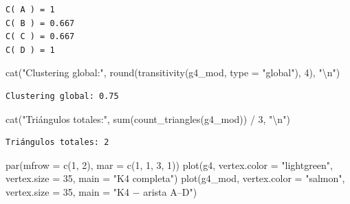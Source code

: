 \documentclass[
  letterpaper,
  DIV=11,
  numbers=noendperiod]{scrreprt}
\newenvironment{Shaded}{\begin{snugshade}}{\end{snugshade}}
\newcommand{\AttributeTok}[1]{\textcolor[rgb]{0.40,0.45,0.13}{#1}}
\newcommand{\DecValTok}[1]{\textcolor[rgb]{0.68,0.00,0.00}{#1}}
\newcommand{\FunctionTok}[1]{\textcolor[rgb]{0.28,0.35,0.67}{#1}}
\newcommand{\NormalTok}[1]{\textcolor[rgb]{0.00,0.23,0.31}{#1}}
\newcommand{\SpecialCharTok}[1]{\textcolor[rgb]{0.37,0.37,0.37}{#1}}
\newcommand{\StringTok}[1]{\textcolor[rgb]{0.13,0.47,0.30}{#1}}
\begin{document}
\begin{tcolorbox}
\begin{verbatim}
C( A ) = 1 
C( B ) = 0.667 
C( C ) = 0.667 
C( D ) = 1 
\end{verbatim}

\begin{Shaded}
\begin{Highlighting}[]
\FunctionTok{cat}\NormalTok{(}\StringTok{"Clustering global:"}\NormalTok{, }\FunctionTok{round}\NormalTok{(}\FunctionTok{transitivity}\NormalTok{(g4\_mod, }\AttributeTok{type =} \StringTok{"global"}\NormalTok{), }\DecValTok{4}\NormalTok{), }\StringTok{"}\SpecialCharTok{\textbackslash{}n}\StringTok{"}\NormalTok{)}
\end{Highlighting}
\end{Shaded}

\begin{verbatim}
Clustering global: 0.75 
\end{verbatim}

\begin{Shaded}
\begin{Highlighting}[]
\FunctionTok{cat}\NormalTok{(}\StringTok{"Triángulos totales:"}\NormalTok{, }\FunctionTok{sum}\NormalTok{(}\FunctionTok{count\_triangles}\NormalTok{(g4\_mod)) }\SpecialCharTok{/} \DecValTok{3}\NormalTok{, }\StringTok{"}\SpecialCharTok{\textbackslash{}n}\StringTok{"}\NormalTok{)}
\end{Highlighting}
\end{Shaded}

\begin{verbatim}
Triángulos totales: 2 
\end{verbatim}

\begin{Shaded}
\begin{Highlighting}[]
\FunctionTok{par}\NormalTok{(}\AttributeTok{mfrow =} \FunctionTok{c}\NormalTok{(}\DecValTok{1}\NormalTok{, }\DecValTok{2}\NormalTok{), }\AttributeTok{mar =} \FunctionTok{c}\NormalTok{(}\DecValTok{1}\NormalTok{, }\DecValTok{1}\NormalTok{, }\DecValTok{3}\NormalTok{, }\DecValTok{1}\NormalTok{))}
\FunctionTok{plot}\NormalTok{(g4, }\AttributeTok{vertex.color =} \StringTok{"lightgreen"}\NormalTok{, }\AttributeTok{vertex.size =} \DecValTok{35}\NormalTok{, }\AttributeTok{main =} \StringTok{"K4 completa"}\NormalTok{)}
\FunctionTok{plot}\NormalTok{(g4\_mod, }\AttributeTok{vertex.color =} \StringTok{"salmon"}\NormalTok{, }\AttributeTok{vertex.size =} \DecValTok{35}\NormalTok{, }\AttributeTok{main =} \StringTok{"K4 − arista A–D"}\NormalTok{)}
\end{Highlighting}
\end{Shaded}


\end{tcolorbox}
\end{document}
